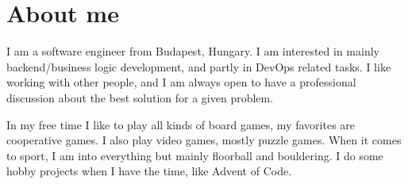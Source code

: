 \documentclass[letterpaper]{twentysecondcv} %
\begin{document}

\aboutme{}









\vspace*{-0.6cm}
\section{About me}

\begin{minipage}{0.95\textwidth}I am a software engineer from Budapest, Hungary. I am interested in mainly backend/business logic development, and partly in DevOps related tasks. I like working with other people, and I am always open to have a professional discussion about the best solution for a given problem.

	In my free time I like to play all kinds of board games, my favorites are cooperative games. I also play video games, mostly puzzle games. When it comes to sport, I am into everything but mainly floorball and bouldering. I do some hobby projects when I have the time, like Advent of Code.
\end{minipage}
\end{document}
